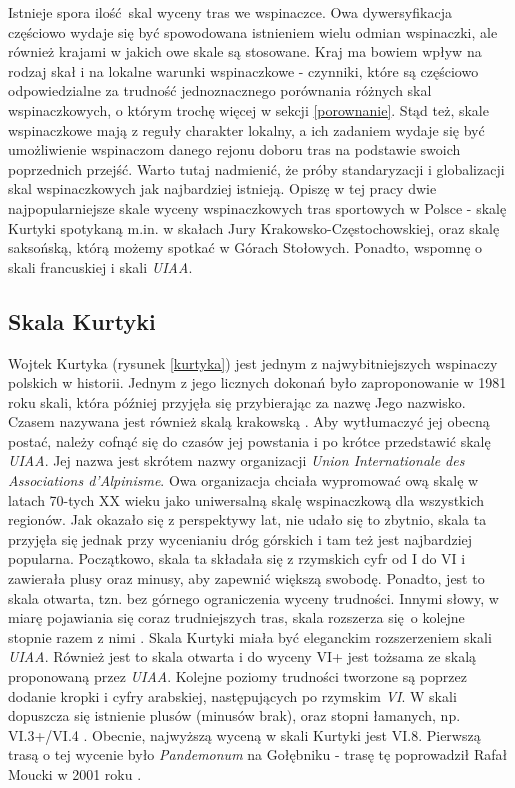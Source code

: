 \documentclass{article}
\begin{document}
Istnieje spora ilość skal wyceny tras we wspinaczce. Owa dywersyfikacja częściowo wydaje się być spowodowana istnieniem wielu odmian wspinaczki, ale również krajami w jakich owe skale są stosowane. Kraj ma bowiem wpływ na rodzaj skał i na lokalne warunki wspinaczkowe - czynniki, które są częściowo odpowiedzialne za trudność jednoznacznego porównania różnych skal wspinaczkowych, o którym trochę więcej w sekcji \ref{porownanie}. Stąd też, skale wspinaczkowe mają z reguły charakter lokalny, a ich zadaniem wydaje się być umożliwienie wspinaczom danego rejonu doboru tras na podstawie swoich poprzednich przejść. Warto tutaj nadmienić, że próby standaryzacji i globalizacji skal wspinaczkowych jak najbardziej istnieją. Opiszę w tej pracy dwie najpopularniejsze skale wyceny wspinaczkowych tras sportowych w Polsce - skalę Kurtyki spotykaną m.in. w skałach Jury Krakowsko-Częstochowskiej, oraz skalę saksońską, którą możemy spotkać w Górach Stołowych. Ponadto, wspomnę o skali francuskiej i skali \textit{UIAA}.

\subsection{Skala Kurtyki}
\label{skala-kurtyki}
Wojtek Kurtyka (rysunek \ref{kurtyka}) jest jednym z najwybitniejszych wspinaczy polskich w historii. Jednym z jego licznych dokonań było zaproponowanie w 1981 roku skali, która później przyjęła się przybierając za nazwę Jego nazwisko. Czasem nazywana jest również skalą krakowską \cite{wiki-skale}. Aby wytłumaczyć jej obecną postać, należy cofnąć się do czasów jej powstania i po krótce przedstawić skalę \textit{UIAA}. Jej nazwa jest skrótem nazwy organizacji \textit{Union Internationale des Associations d'Alpinisme}. Owa organizacja chciała wypromować ową skalę w latach 70-tych XX wieku jako uniwersalną skalę wspinaczkową dla wszystkich regionów. Jak okazało się z perspektywy lat, nie udało się to zbytnio, skala ta przyjęła się jednak przy wycenianiu dróg górskich i tam też jest najbardziej popularna. Początkowo, skala ta składała się z rzymskich cyfr od I do VI i zawierała plusy oraz minusy, aby zapewnić większą swobodę. Ponadto, jest to skala otwarta, tzn. bez górnego ograniczenia wyceny trudności. Innymi słowy, w miarę pojawiania się coraz trudniejszych tras, skala rozszerza się o kolejne stopnie razem z nimi \cite{uiaa-skala}\cite{skalnik-skale}. Skala Kurtyki miała być eleganckim rozszerzeniem skali \textit{UIAA}. Również jest to skala otwarta i do wyceny VI+ jest tożsama ze skalą proponowaną przez \textit{UIAA}. Kolejne poziomy trudności tworzone są poprzez dodanie kropki i cyfry arabskiej, następujących po rzymskim \textit{VI}. W skali dopuszcza się istnienie plusów (minusów brak), oraz stopni łamanych, np. VI.3+/VI.4 \cite{drytooling-skale}. Obecnie, najwyższą wyceną w skali Kurtyki jest VI.8. Pierwszą trasą o tej wycenie było \textit{Pandemonum} na Gołębniku - trasę tę poprowadził Rafał Moucki w 2001 roku \cite{VI8}.
\end{document}
